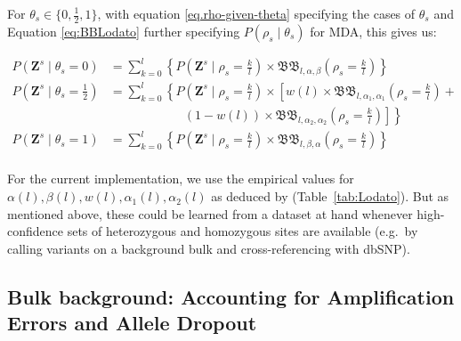 \documentclass[authoryear,preprint,11pt]{scrartcl}
\newcommand{\Prob}{{P}}
\newcommand{\cB}{{\mathfrak B}}
\begin{document}
For $\theta_s \in \{0,\frac12,1\}$, with equation \ref{eq.rho-given-theta} specifying the cases of $\theta_s$ and Equation \ref{eq:BBLodato} further specifying $\Prob(\rho_s \mid \theta_s
 )$ for MDA, this gives us:

\begin{equation}
 \label{eq:thetas-likelihood}
 \begin{split}
  \Prob(\boldsymbol{Z}^s \mid \theta_s = 0) &=  \sum_{k=0}^{l} \left\{ \Prob(\boldsymbol{Z}^s \mid \rho_s = \frac{k}{l}) \times \cB\cB_{l,\alpha, \beta} (\rho_s = \frac{k}{l}) \right\}\\
  \Prob(\boldsymbol{Z}^s \mid \theta_s = \frac12) &= \sum_{k=0}^{l} \left\{ \Prob(\boldsymbol{Z}^s \mid \rho_s = \frac{k}{l}) \times \left[ w(l) \times \cB\cB_{l,\alpha_1,\alpha_1}(\rho_s = \frac{k}{l}) + \right.\right.\\
   &\qquad \qquad \qquad \left.\left.(1-w(l)) \times \cB\cB_{l,\alpha_2,\alpha_2}(\rho_s = \frac{k}{l}) \right] \right\} \\
  \Prob(\boldsymbol{Z}^s \mid \theta_s = 1) &=  \sum_{k=0}^{l} \left\{ \Prob(\boldsymbol{Z}^s \mid \rho_s = \frac{k}{l}) \times \cB\cB_{l,\beta, \alpha} (\rho_s = \frac{k}{l}) \right\}\\
 \end{split}
\end{equation}

For the current implementation, we use the empirical values for $\alpha(l), \beta(l), w(l), \alpha_1(l), \alpha_2(l)$ as deduced by \cite{lodato_somatic_2015} (Table~\ref{tab:Lodato}).
But as mentioned above, these could be learned from a dataset at hand whenever high-confidence sets of heterozygous and homozygous sites are available (e.g.~by calling variants on a background bulk and cross-referencing with dbSNP).\\

\subsection{Bulk background: Accounting for Amplification Errors and Allele Dropout}
\end{document}
